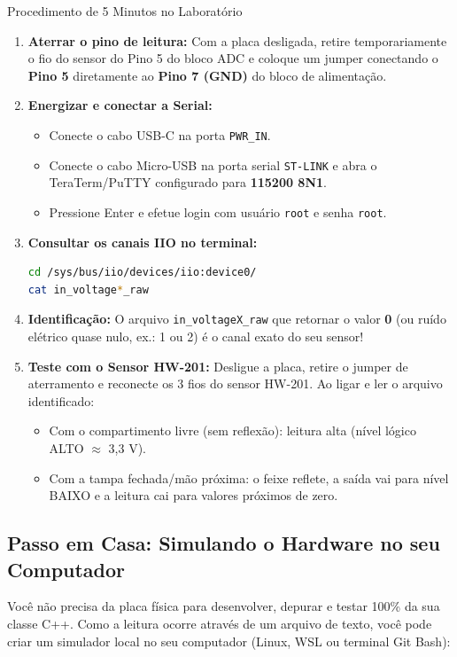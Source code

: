 \documentclass[11pt,a4paper]{article}
\begin{document}
\begin{labbox}{Procedimento de 5 Minutos no Laboratório}
\begin{enumerate}[leftmargin=*]
    \item \textbf{Aterrar o pino de leitura:} Com a placa desligada, retire temporariamente o fio do sensor do Pino 5 do bloco ADC e coloque um jumper conectando o \textbf{Pino 5} diretamente ao \textbf{Pino 7 (GND)} do bloco de alimentação.
    \item \textbf{Energizar e conectar a Serial:}
    \begin{itemize}
        \item Conecte o cabo USB-C na porta \texttt{PWR\_IN}.
        \item Conecte o cabo Micro-USB na porta serial \texttt{ST-LINK} e abra o TeraTerm/PuTTY configurado para \textbf{115200 8N1}.
        \item Pressione Enter e efetue login com usuário \texttt{root} e senha \texttt{root}.
    \end{itemize}
    \item \textbf{Consultar os canais IIO no terminal:}
\begin{lstlisting}[language=bash]
cd /sys/bus/iio/devices/iio:device0/
cat in_voltage*_raw
\end{lstlisting}
    \item \textbf{Identificação:} O arquivo \texttt{in\_voltageX\_raw} que retornar o valor \textbf{0} (ou ruído elétrico quase nulo, ex.: 1 ou 2) é o canal exato do seu sensor!
    \item \textbf{Teste com o Sensor HW-201:} Desligue a placa, retire o jumper de aterramento e reconecte os 3 fios do sensor HW-201. Ao ligar e ler o arquivo identificado:
    \begin{itemize}
        \item Com o compartimento livre (sem reflexão): leitura alta (nível lógico ALTO $\approx$ 3,3 V).
        \item Com a tampa fechada/mão próxima: o feixe reflete, a saída vai para nível BAIXO e a leitura cai para valores próximos de zero.
    \end{itemize}
\end{enumerate}
\end{labbox}

\subsection{Passo em Casa: Simulando o Hardware no seu Computador}
Você não precisa da placa física para desenvolver, depurar e testar 100\% da sua classe C++. Como a leitura ocorre através de um arquivo de texto, você pode criar um simulador local no seu computador (Linux, WSL ou terminal Git Bash):
\end{document}
